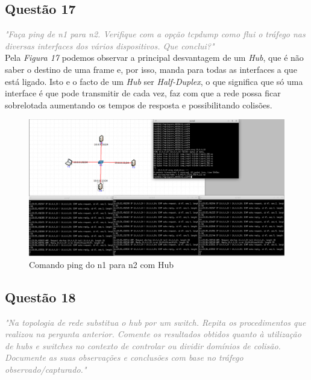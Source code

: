 \documentclass{llncs}
\newcommand{\questionE}[1]{\textcolor{gray}{\textit{"#1"}}}
\begin{document}
\subsection{Questão 17}
\hspace{3mm} 
\questionE{Faça	ping de	n1 para n2.	Verifique com a opção tcpdump como flui o tráfego nas diversas interfaces dos vários dispositivos. Que conclui?}\\

Pela \textit{Figura 17} podemos observar a principal desvantagem de um \textit{Hub}, que é não saber o destino de uma frame e, por isso, manda para todas as interfaces a que está ligado. 
Isto e o facto de um \textit{Hub} ser \textit{Half-Duplex}, o que significa que só uma interface é que pode transmitir de cada vez, faz com que a rede possa ficar sobrelotada aumentando os tempos de resposta e possibilitando colisões.

\begin{figure}[H]
\begin{center}
\includegraphics[width=13cm]{ex617.PNG}
\end{center}
\caption{Comando ping do n1 para n2 com Hub}
\end{figure}

\clearpage

\subsection{Questão 18}
\hspace{3mm} 
\questionE{Na topologia de rede substitua o hub por um	switch. Repita os procedimentos que realizou na pergunta anterior. Comente os resultados obtidos quanto à utilização de hubs e switches no contexto de controlar ou dividir domínios de colisão. Documente as suas observações e conclusões com base no tráfego observado/capturado.}\\
\end{document}
